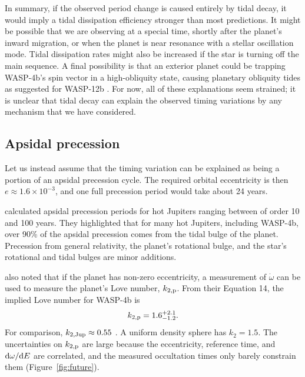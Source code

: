\documentclass[12pt,twocolumn,tighten]{aastex62}
\begin{document}
In summary, if the observed period change is caused entirely by tidal
decay, it would imply a tidal dissipation efficiency stronger than
most predictions.  It might be possible that we are observing at a
special time, shortly after the planet's inward migration, or when the
planet is near resonance with a stellar oscillation mode.  Tidal
dissipation rates might also be increased if the star is turning off
the main sequence.  A final possibility is that an exterior planet
could be trapping WASP-4b's spin vector in a high-obliquity state,
causing planetary obliquity tides as suggested for WASP-12b
\citep{millholland_obliquity_2018}.  For now, all of these
explanations seem strained; it is unclear that tidal decay can explain
the observed timing variations by any mechanism that we have
considered.


\subsection{Apsidal precession}
\label{sec:apsidal_precession}

Let us instead assume that the timing variation can be explained as
being a portion of an apsidal precession cycle.  The required orbital
eccentricity is then $e\approx 1.6\times10^{-3}$, and one full
precession period would take about 24 years.

\citet{ragozzine_probing_2009} calculated apsidal precession periods
for hot Jupiters ranging between of order 10 and 100 years.  They
highlighted that for many hot Jupiters, including WASP-4b, over 90\%
of the apsidal precession comes from the tidal bulge of the planet.
Precession from general relativity, the planet's rotational bulge, and
the star's rotational and tidal bulges are minor additions.

\citet{ragozzine_probing_2009} also noted that if the planet has
non-zero eccentricity, a measurement of $\dot{\omega}$ can be used to
measure the planet's Love number, $k_{2,\rm p}$.  From their Equation
14, the implied Love number for WASP-4b is
\begin{equation}
k_{2,{\rm p}} = 1.6^{+2.1}_{-1.2}.
\end{equation}
For comparison, $k_{2,{\rm Jup}} \approx 0.55$
\citep{wahl_tidal_2016,ni_empirical_2018}.  A uniform density sphere
has $k_2 = 1.5$.  The uncertainties on $k_{2,{\rm p}}$ are large
because the eccentricity, reference time, and ${\rm d}\omega/{\rm d}E$
are correlated, and the measured occultation times only barely
constrain them (Figure~\ref{fig:future}).
\end{document}
